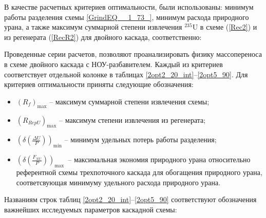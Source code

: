 В качестве расчетных критериев оптимальности, были использованы: минимум работы разделения схемы \ref{GrindEQ__1_73_}, минимум расхода природного урана, а также максимум суммарной степени извлечения $^{235}$U в схеме (\ref{Rec2}) и из регенерата (\ref{RecR2}) для двойного каскада, соответственно:

Проведенные серии расчетов, позволяют проанализировать физику массопереноса в схеме двойного каскада с НОУ-разбавителем. Каждый из критериев соответствует отдельной колонке в таблицах \ref{2opt2_20_int}--\ref{2opt5_90}. Для критериев оптимальности приняты следующие обозначения:

\begin{itemize}
    \item $(R_f)_\text{max}$ -- максимум суммарной степени извлечения схемы;
    \item $(R_{RepU})_\text{max}$ -- максимум степени извлечения из регенерата;
    \item $(\delta(\frac{\Delta U}{P}))_\text{min}$ -- минимум удельных потерь работы разделения; 
    \item $(\delta(\frac{F_{NU}}{P}))_\text{max}$\ -- максимальная экономия природного урана относительно референтной схемы трехпоточного каскада для обогащения природного урана, соответсвующая минимуму удельного расхода природного урана.
\end{itemize}

Названиям строк таблиц \ref{2opt2_20_int}--\ref{2opt5_90} соответствуют обозначения важнейших исследуемых параметров каскадной схемы:


